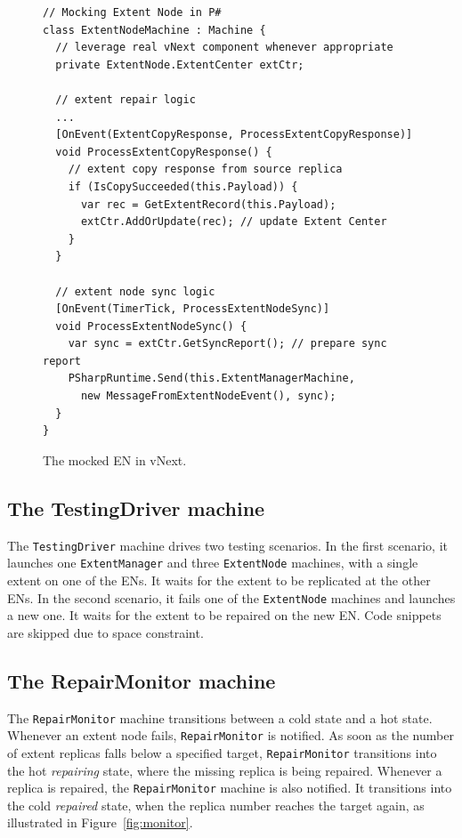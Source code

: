 \begin{figure}[t]
\begin{lstlisting}
// Mocking Extent Node in P#
class ExtentNodeMachine : Machine {
  // leverage real vNext component whenever appropriate
  private ExtentNode.ExtentCenter extCtr;

  // extent repair logic
  ...
  [OnEvent(ExtentCopyResponse, ProcessExtentCopyResponse)]
  void ProcessExtentCopyResponse() {
    // extent copy response from source replica
    if (IsCopySucceeded(this.Payload)) {
      var rec = GetExtentRecord(this.Payload);
      extCtr.AddOrUpdate(rec); // update Extent Center
    }
  }

  // extent node sync logic
  [OnEvent(TimerTick, ProcessExtentNodeSync)]
  void ProcessExtentNodeSync() {
    var sync = extCtr.GetSyncReport(); // prepare sync report
    PSharpRuntime.Send(this.ExtentManagerMachine,
      new MessageFromExtentNodeEvent(), sync);
  }
}
\end{lstlisting}
\vspace{-2mm}
\caption{The mocked EN in vNext.}
\label{fig:mocked_en}
\end{figure}

\subsection{The TestingDriver machine}
\label{sec:method:driver}

The \texttt{TestingDriver} machine drives two testing scenarios. In the first scenario, it launches one \texttt{ExtentManager} and three \texttt{ExtentNode} machines, with a single extent on one of the ENs. It waits for the extent to be replicated at the other ENs. In the second scenario, it fails one of the \texttt{ExtentNode} machines and launches a new one. It waits for the extent to be repaired on the new EN. Code snippets are skipped due to space constraint.

\subsection{The RepairMonitor machine}
\label{sec:method:monitor}

The \texttt{RepairMonitor} machine transitions between a cold state and a hot state. Whenever an extent node fails, \texttt{RepairMonitor} is notified. As soon as the number of extent replicas falls below a specified target, \texttt{RepairMonitor} transitions into the hot \emph{repairing} state, where the missing replica is being repaired. Whenever a replica is repaired, the \texttt{RepairMonitor} machine is also notified. It transitions into the cold \emph{repaired} state, when the replica number reaches the target again, as illustrated in Figure~\ref{fig:monitor}.

